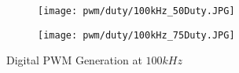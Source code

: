 \begin{figure}[H]
    \centering
    \begin{subfigure}{0.45\textwidth}
        \texttt{[image: pwm/duty/100kHz\_50Duty.JPG]}

    \end{subfigure}
    \begin{subfigure}{0.45\textwidth}
        \texttt{[image: pwm/duty/100kHz\_75Duty.JPG]}

    \end{subfigure}
    \caption{Digital PWM Generation at $100kHz$}

\end{figure}
